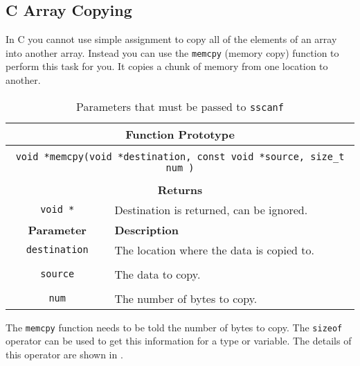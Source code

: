 \subsection{C Array Copying} %
\label{sub:c_array_copying}

In C you cannot use simple assignment to copy all of the elements of an array into another array. Instead you can use the \texttt{memcpy} (memory copy) function to perform this task for you. It copies a chunk of memory from one location to another.

\begin{table}[h]
  \centering
  \begin{tabular}{|c|p{9.5cm}|}
    \hline
    \multicolumn{2}{|c|}{\textbf{Function Prototype}} \\
    \hline
    \multicolumn{2}{|c|}{} \\
    \multicolumn{2}{|c|}{\texttt{void *memcpy(void *destination, const void *source, size\_t num )}} \\
    \multicolumn{2}{|c|}{} \\
    \hline
    \multicolumn{2}{|c|}{\textbf{Returns}} \\
    \hline
    \texttt{void *} & Destination is returned, can be ignored. \\
    \hline
    \textbf{Parameter} & \textbf{Description} \\
    \hline
    \texttt{ destination } & The location where the data is copied to.\\
    & \\
    \texttt{ source } & The data to copy.\\
    & \\
    \texttt{ num } & The number of bytes to copy. \\
    \hline
  \end{tabular}
  \caption{Parameters that must be passed to \texttt{sscanf}}
  \label{tbl:memcpy}
\end{table}

The \texttt{memcpy} function needs to be told the number of bytes to copy. The \texttt{sizeof} operator can be used to get this information for a type or variable. The details of this operator are shown in . 




